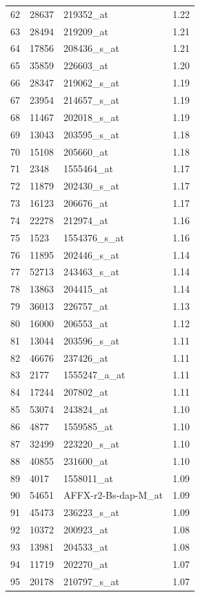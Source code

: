 \documentclass[a4paper, 12pt]{report}
\begin{document}
\begin{footnotesize}
\begin{longtable}{|>{}m{1cm} |>{}m{2cm} | >{}m{5cm}| >{}m{4cm} | }
  62 & 28637 & 219352\_at & 1.22 \\ 
  63 & 28494 & 219209\_at & 1.21 \\ 
  64 & 17856 & 208436\_s\_at & 1.21 \\ 
  65 & 35859 & 226603\_at & 1.20 \\ 
  66 & 28347 & 219062\_s\_at & 1.19 \\ 
  67 & 23954 & 214657\_s\_at & 1.19 \\ 
  68 & 11467 & 202018\_s\_at & 1.19 \\ 
  69 & 13043 & 203595\_s\_at & 1.18 \\ 
  70 & 15108 & 205660\_at & 1.18 \\ 
  71 & 2348 & 1555464\_at & 1.17 \\ 
  72 & 11879 & 202430\_s\_at & 1.17 \\ 
  73 & 16123 & 206676\_at & 1.17 \\ 
  74 & 22278 & 212974\_at & 1.16 \\ 
  75 & 1523 & 1554376\_s\_at & 1.16 \\ 
  76 & 11895 & 202446\_s\_at & 1.14 \\ 
  77 & 52713 & 243463\_s\_at & 1.14 \\ 
  78 & 13863 & 204415\_at & 1.14 \\ 
  79 & 36013 & 226757\_at & 1.13 \\ 
  80 & 16000 & 206553\_at & 1.12 \\ 
  81 & 13044 & 203596\_s\_at & 1.11 \\ 
  82 & 46676 & 237426\_at & 1.11 \\ 
  83 & 2177 & 1555247\_a\_at & 1.11 \\ 
  84 & 17244 & 207802\_at & 1.11 \\ 
  85 & 53074 & 243824\_at & 1.10 \\ 
  86 & 4877 & 1559585\_at & 1.10 \\ 
  87 & 32499 & 223220\_s\_at & 1.10 \\ 
  88 & 40855 & 231600\_at & 1.10 \\ 
  89 & 4017 & 1558011\_at & 1.09 \\ 
  90 & 54651 & AFFX-r2-Bs-dap-M\_at & 1.09 \\ 
  91 & 45473 & 236223\_s\_at & 1.09 \\ 
  92 & 10372 & 200923\_at & 1.08 \\ 
  93 & 13981 & 204533\_at & 1.08 \\ 
  94 & 11719 & 202270\_at & 1.07 \\ 
  95 & 20178 & 210797\_s\_at & 1.07 \\ 

\end{longtable}
\end{footnotesize}
\end{document}
